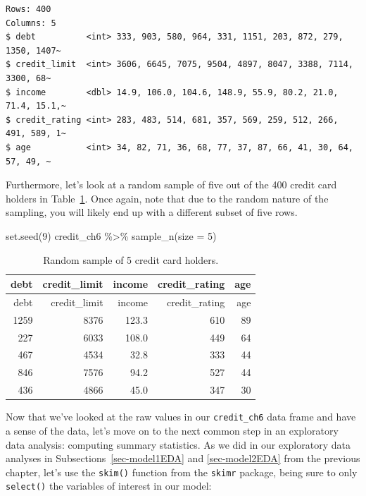\documentclass[
  letterpaper,
  DIV=11,
  numbers=noendperiod]{scrreprt}
\newenvironment{Shaded}{\begin{snugshade}}{\end{snugshade}}
\newcommand{\AttributeTok}[1]{\textcolor[rgb]{0.40,0.45,0.13}{#1}}
\newcommand{\DecValTok}[1]{\textcolor[rgb]{0.68,0.00,0.00}{#1}}
\newcommand{\FunctionTok}[1]{\textcolor[rgb]{0.28,0.35,0.67}{#1}}
\newcommand{\NormalTok}[1]{\textcolor[rgb]{0.00,0.23,0.31}{#1}}
\newcommand{\SpecialCharTok}[1]{\textcolor[rgb]{0.37,0.37,0.37}{#1}}
\theoremstyle{definition}
\theoremstyle{remark}
\begin{document}
\begin{verbatim}
Rows: 400
Columns: 5
$ debt          <int> 333, 903, 580, 964, 331, 1151, 203, 872, 279, 1350, 1407~
$ credit_limit  <int> 3606, 6645, 7075, 9504, 4897, 8047, 3388, 7114, 3300, 68~
$ income        <dbl> 14.9, 106.0, 104.6, 148.9, 55.9, 80.2, 21.0, 71.4, 15.1,~
$ credit_rating <int> 283, 483, 514, 681, 357, 569, 259, 512, 266, 491, 589, 1~
$ age           <int> 34, 82, 71, 36, 68, 77, 37, 87, 66, 41, 30, 64, 57, 49, ~
\end{verbatim}

Furthermore, let's look at a random sample of five out of the 400 credit
card holders in Table~\ref{tbl-model3-data-preview}. Once again, note
that due to the random nature of the sampling, you will likely end up
with a different subset of five rows.

\begin{Shaded}
\begin{Highlighting}[]
\FunctionTok{set.seed}\NormalTok{(}\DecValTok{9}\NormalTok{)}
\NormalTok{credit\_ch6 }\SpecialCharTok{\%\textgreater{}\%}
  \FunctionTok{sample\_n}\NormalTok{(}\AttributeTok{size =} \DecValTok{5}\NormalTok{)}
\end{Highlighting}
\end{Shaded}

\hypertarget{tbl-model3-data-preview}{}
\begin{longtable}[]{@{}rrrrr@{}}
\caption{\label{tbl-model3-data-preview}Random sample of 5 credit card
holders.}\tabularnewline
\toprule()
debt & credit\_limit & income & credit\_rating & age \\
\midrule()
\endfirsthead
\toprule()
debt & credit\_limit & income & credit\_rating & age \\
\midrule()
\endhead
1259 & 8376 & 123.3 & 610 & 89 \\
227 & 6033 & 108.0 & 449 & 64 \\
467 & 4534 & 32.8 & 333 & 44 \\
846 & 7576 & 94.2 & 527 & 44 \\
436 & 4866 & 45.0 & 347 & 30 \\
\bottomrule()
\end{longtable}

Now that we've looked at the raw values in our \texttt{credit\_ch6} data
frame and have a sense of the data, let's move on to the next common
step in an exploratory data analysis: computing summary statistics. As
we did in our exploratory data analyses in
Subsections~\ref{sec-model1EDA} and \ref{sec-model2EDA} from the
previous chapter, let's use the \texttt{skim()} function from the
\texttt{skimr} package, being sure to only \texttt{select()} the
variables of interest in our model:
\end{document}

